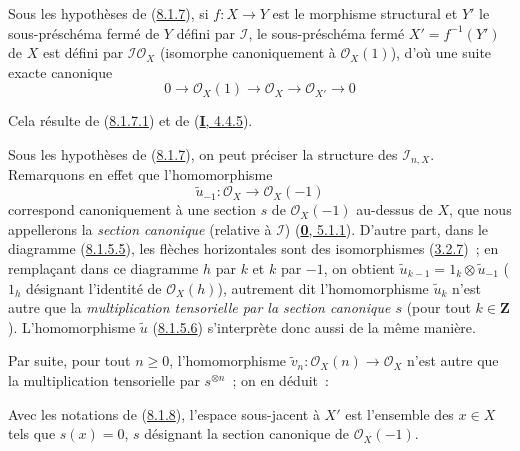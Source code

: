 \begin{corollary}[8.1.8]
\label{II.8.1.8-fr}
Sous les hypothèses de \textup{(\hyperref[II.8.1.7-fr]{8.1.7})}, si $f:X\to Y$ est le
morphisme structural et $Y'$ le sous-préschéma fermé de $Y$ défini par
$\mathcal{I}$, le sous-préschéma fermé $X'=f^{-1}(Y')$ de $X$ est défini par
$\mathcal{I}\mathcal{O}_X$ (isomorphe canoniquement à $\mathcal{O}_X(1)$),
d'où une suite exacte canonique
\begin{equation}
\label{II.8.1.8.1-fr}
  0\to\mathcal{O}_X(1)\to\mathcal{O}_X\to\mathcal{O}_{X'}\to0
\tag{8.1.8.1}
\end{equation}
\end{corollary}

Cela résulte de (\hyperref[II.8.1.7.1-fr]{8.1.7.1}) et de
(\hyperref[I.4.4.5-fr]{\textbf{I}, 4.4.5}).

\begin{env}[8.1.9]
\label{II.8.1.9-fr}
Sous les hypothèses de (\hyperref[II.8.1.7-fr]{8.1.7}), on peut préciser la
structure des $\mathcal{I}_{n,X}$. Remarquons en effet que l'homomorphisme
\[
  \widetilde{u}_{-1}:\mathcal{O}_X\to\mathcal{O}_X(-1)
\]
correspond canoniquement à une section $s$ de $\mathcal{O}_X(-1)$ au-dessus de
$X$, que nous appellerons la \emph{section canonique} (relative à
$\mathcal{I}$) (\hyperref[0.5.1.1-fr]{\textbf{0}, 5.1.1}). D'autre part, dans le
diagramme (\hyperref[II.8.1.5.5-fr]{8.1.5.5}), les flèches horizontales sont
des isomorphismes (\hyperref[II.3.2.7-fr]{3.2.7})~; en remplaçant dans ce
diagramme $h$ par $k$ et $k$ par $-1$, on obtient
$\widetilde{u}_{k-1}=1_k\otimes\widetilde{u}_{-1}$ ($1_h$ désignant l'identité de
$\mathcal{O}_X(h)$), autrement dit l'homomorphisme $\widetilde{u}_k$ n'est
autre que la \emph{multiplication tensorielle par la section canonique $s$}
(pour tout $k\in\mathbf{Z}$). L'homomorphisme $\widetilde{u}$
(\hyperref[II.8.1.5.6-fr]{8.1.5.6}) s'interprète donc aussi de la même manière.

Par suite, pour tout $n\geq0$, l'homomorphisme
$\widetilde{v}_n:\mathcal{O}_X(n)\to\mathcal{O}_X$ n'est autre que la
multiplication tensorielle par $s^{\otimes n}$~; on en déduit~:
\end{env}

\begin{corollary}[8.1.10]
\label{II.8.1.10-fr}
Avec les notations de \textup{(\hyperref[II.8.1.8-fr]{8.1.8})}, l'espace sous-jacent à
$X'$ est l'ensemble des $x\in X$ tels que $s(x)=0$, $s$ désignant la section
canonique de $\mathcal{O}_X(-1)$.
\end{corollary}

